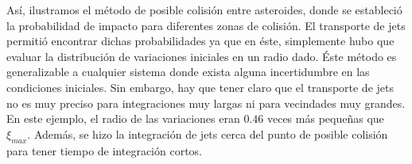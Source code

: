 Así, ilustramos el método de posible colisión entre asteroides, donde se estableció la probabilidad de impacto para diferentes zonas de colisión. El transporte de jets permitió encontrar dichas probabilidades ya que en éste, simplemente hubo que evaluar la distribución de variaciones iniciales en un radio dado. Éste método es generalizable a cualquier sistema donde exista alguna incertidumbre en las condiciones iniciales. Sin embargo, hay que tener claro que el transporte de jets no es muy preciso para integraciones muy largas ni para vecindades muy grandes. En este ejemplo, el radio de las variaciones eran $0.46$ veces más pequeñas que $\xi_{max}$. Además, se hizo la integración de jets cerca del punto de posible colisión para tener tiempo de integración cortos. 

